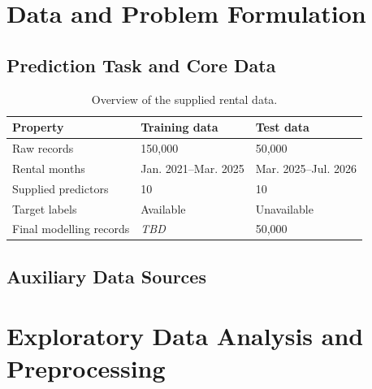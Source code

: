 \documentclass[conference]{IEEEtran}
\newif\ifoutline
\newcommand{\guide}[1]{%
  \ifoutline\par\noindent{\small\color{blue!65!black}%
  \textit{Writing prompt: #1}}\par\fi}
\newcommand{\pending}{\textit{TBD}}
\newcommand{\field}[1]{\texttt{\detokenize{#1}}}
\begin{document}
\section{Data and Problem Formulation}
\label{sec:data}

\subsection{Prediction Task and Core Data}
\guide{Define supervised regression from rental attributes to
\field{MONTHLY_RENT} in SGD. Summarise the supplied inputs, labelled data and
test data. Distinguish raw sample counts from the counts used by the final
training pipeline. The goal is prediction, not estimation of causal effects.}

\begin{table}[t]
  \caption{Overview of the supplied rental data.}
  \label{tab:data}
  \centering
  \small
  \begin{tabularx}{\columnwidth}{lXX}
    \toprule
    Property & Training data & Test data \\
    \midrule
    Raw records & 150,000 & 50,000 \\
    Rental months & Jan. 2021--Mar. 2025 & Mar. 2025--Jul. 2026 \\
    Supplied predictors & 10 & 10 \\
    Target labels & Available & Unavailable \\
    Final modelling records & \pending & 50,000 \\
    \bottomrule
  \end{tabularx}
\end{table}
\guide{Refer to Table~\ref{tab:data}. Explain that a small part of the test
data overlaps the final training month, while most records are later. Do not
describe every test record as strictly later than all training observations.}

\subsection{Auxiliary Data Sources}
\guide{Introduce HDB block metadata, MRT stations, schools, shopping malls,
COE prices and stock prices. Identify which sources were evaluated and which
were retained in the final model. Investigation or feature construction alone
does not establish predictive value. Cite the actual dataset sources.}

\section{Exploratory Data Analysis and Preprocessing}
\label{sec:eda}
\end{document}
